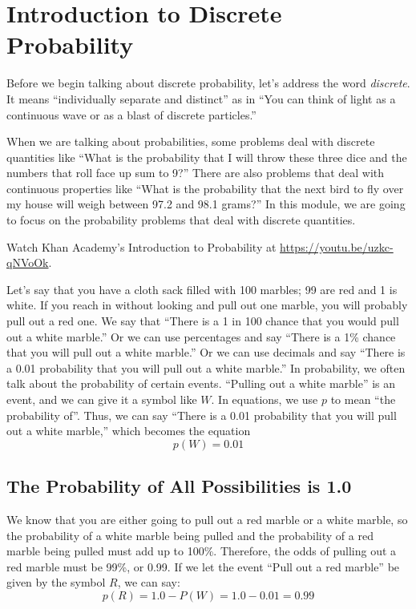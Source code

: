 \chapter{Introduction to Discrete Probability}

Before we begin talking about discrete probability, let's address the word \emph{discrete}. It means ``individually
separate and distinct'' as in ``You can think of light as a
continuous wave or as a blast of discrete particles.''

When we are talking about probabilities, some problems deal
with discrete quantities like ``What is the probability that I will
throw these three dice and the numbers that roll face up sum to 9?'' There
are also problems that deal with continuous properties like ``What is
the probability that the next bird to fly over my house will weigh
between 97.2 and 98.1 grams?'' In this module, we are going to focus
on the probability problems that deal with discrete quantities.

Watch Khan Academy's Introduction to Probability at \url{https://youtu.be/uzkc-qNVoOk}.

Let's say that you have a cloth sack filled with 100 marbles; 99 are red
and 1 is white. If you reach in without looking and pull out
one marble, you will probably pull out a red one. We say that ``There
is a 1 in 100 chance that you would pull out a white marble.'' Or we
can use percentages and say ``There is a 1\% chance that you will pull
out a white marble.'' Or we can use decimals and say ``There is a 0.01
probability that you will pull out a white marble.''
In probability, we often talk about the probability of certain
events. ``Pulling out a white marble'' is an event, and we can give it
a symbol like $W$. In equations, we use $p$ to mean ``the
probability of''. Thus, we can say ``There is a 0.01 probability that
you will pull out a white marble,'' which becomes the equation
\begin{equation*}
  p(W) = 0.01
\end{equation*}

\section{The Probability of All Possibilities is 1.0}

We know that you are either going to pull out a red marble or a white marble,
so the probability of a white marble being pulled and the probability
of a red marble being pulled must add up to 100\%. Therefore, the odds of
pulling out a red marble must be 99\%, or 0.99. If we let the event ``Pull out a red marble'' be given by the symbol $R$, we can say:
\begin{equation*}
  p(R) = 1.0 - P(W) = 1.0 - 0.01 = 0.99
\end{equation*}

